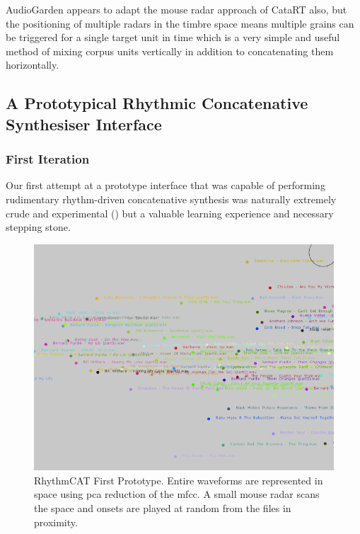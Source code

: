 AudioGarden appears to adapt the mouse radar approach of CataRT also, but the positioning of multiple radars in the timbre space means multiple grains can be triggered for a single target unit in time which is a very simple and useful method of mixing corpus units vertically in addition to concatenating them horizontally.

\subsection{A Prototypical Rhythmic Concatenative Synthesiser Interface}

\subsubsection{First Iteration}

Our first attempt at a prototype interface that was capable of performing rudimentary rhythm-driven concatenative synthesis was naturally extremely crude and experimental () but a valuable learning experience and necessary stepping stone.

\begin{figure}
	\begin{center}
		\includegraphics[width=1.0\textwidth]{ch06_rhythmcat/figures/rhythmcat_proto1.png}
	\end{center}
	\caption[RhythmCAT first prototype]{RhythmCAT First Prototype. Entire waveforms are represented in space using \acrshort{pca} reduction of the \acrshort{mfcc}. A small mouse radar scans the space and onsets are played at random from the files in proximity.}
	\label{fig:rhythmcat_proto1}
\end{figure}

